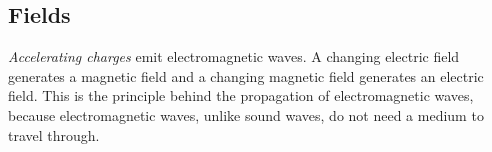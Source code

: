 \label{m38777*secfhsst!!!underscore!!!id79}

            \subsection*{Fields}
            \nopagebreak
      \label{m38777*id187125}\textit{Accelerating charges} emit electromagnetic waves. A changing electric field generates a magnetic field and a changing magnetic field generates an electric field. This is the principle behind the propagation of electromagnetic waves, because electromagnetic waves, unlike sound waves, do not need a medium to travel through. 

